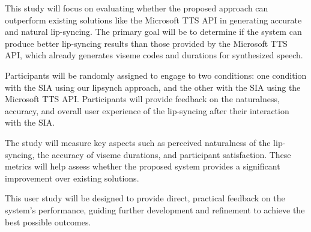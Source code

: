 \documentclass[12pt]{article}
\begin{document}
This study will focus on evaluating whether the proposed approach can outperform existing solutions like the Microsoft TTS API in generating accurate and natural lip-syncing. The primary goal will be to determine if the system can produce better lip-syncing results than those provided by the Microsoft TTS API, which already generates viseme codes and durations for synthesized speech. 

Participants will be randomly assigned to engage to two conditions: one condition with the SIA using our lipsynch approach, and the other with the SIA using the Microsoft TTS API. Participants will provide feedback on the naturalness, accuracy, and overall user experience of the lip-syncing after their interaction with the SIA. 

The study will measure key aspects such as perceived naturalness of the lip-syncing, the accuracy of viseme durations, and participant satisfaction. These metrics will help assess whether the proposed system provides a significant improvement over existing solutions.



This user study will be designed to provide direct, practical feedback on the system’s performance, guiding further development and refinement to achieve the best possible outcomes.



\end{document}

